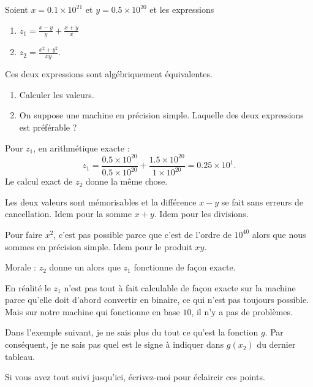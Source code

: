 \begin{example}
	Soient \( x=0.1\times 10^{21}\) et \( y=0.5\times 10^{20}\) et les expressions
	\begin{enumerate}
		\item
		      \( z_1=\frac{ x-y }{ y }+\frac{ x+y }{ x }\)
		\item
		      \( z_2=\frac{ x^2+y^2 }{ xy }\).
	\end{enumerate}
	Ces deux expressions sont algébriquement équivalentes.

	\begin{enumerate}
		\item
		      Calculer les valeurs.
		\item
		      On suppose une machine en précision simple. Laquelle des deux expressions est préférable ?
	\end{enumerate}

	Pour \( z_1 \), en arithmétique exacte :
	\begin{equation}
		z_1=\frac{ 0.5\times 10^{20} }{ 0.5\times 10^{20} }+\frac{ 1.5\times 10^{20} }{ 1\times 10^{20} }=0.25\times 10^{1}.
	\end{equation}
	Le calcul exact de \( z_2\) donne la même chose.

	\begin{subproof}

		\spitem[Calcul de \( z_1\)]

		Les deux valeurs sont mémorisables et la différence \( x-y\) se fait sans erreurs de cancellation. Idem pour la somme \( x+y\). Idem pour les divisions.

		\spitem[Calcul de \( z_2\)]

		Pour faire \( x^2\), c'est pas possible parce que c'est de l'ordre de \( 10^{40}\) alors que nous sommes en précision simple. Idem pour le produit \( xy\).

	\end{subproof}
	Morale : \( z_2\) donne un  alors que \( z_1\) fonctionne de façon exacte.

	\begin{remark}
		En réalité le \( z_1\) n'est pas tout à fait calculable de façon exacte sur la machine parce qu'elle doit d'abord convertir en binaire, ce qui n'est pas toujours possible. Mais sur notre machine qui fonctionne en base \( 10\), il n'y a pas de problèmes.
	\end{remark}
\end{example}

\begin{probleme}
	Dans l'exemple suivant, je ne sais plus du tout ce qu'est la fonction \( g\). Par conséquent, je ne sais pas quel est le signe à indiquer dans \( g(x_2)\) du dernier tableau.

	Si vous avez tout suivi jusqu'ici, écrivez-moi pour éclaircir ces points.
\end{probleme}

